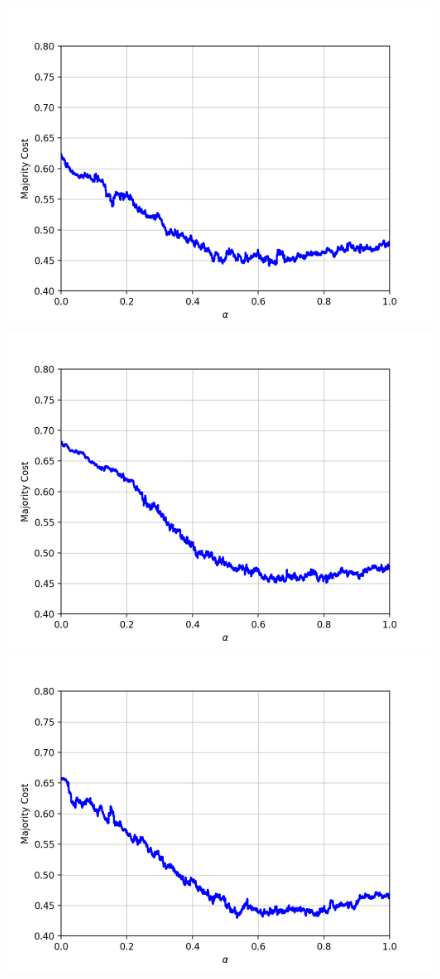 \begin{figure}[h]
\begin{minipage}{.3\textwidth}
  \includegraphics[width=\linewidth]{plots/mnist-ac-2}
\end{minipage}
\begin{minipage}{.3\textwidth}
  \centering
  \includegraphics[width=\linewidth]{plots/mnist-ac-3}
\end{minipage}
\begin{minipage}{.3\textwidth}
  \centering
  \includegraphics[width=\linewidth]{plots/mnist-ac-4}

\end{minipage}
\end{figure}
